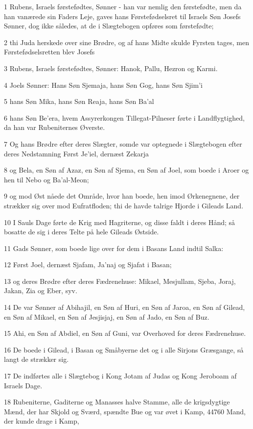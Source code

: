 \par 1 Rubens, Israels førstefødtes, Sønner - han var nemlig den førstefødte, men da han vanærede sin Faders Leje, gaves hans Førstefødselsret til Israels Søn Josefs Sønner, dog ikke således, at de i Slægtebogen opføres som førstefødte;
\par 2 thi Juda herskede over sine Brødre, og af hans Midte skulde Fyrsten tages, men Førstefødselsretten blev Josefs
\par 3 Rubens, Israels førstefødtes, Sønner: Hanok, Pallu, Hezron og Karmi.
\par 4 Joels Sønner: Hans Søn Sjemaja, hans Søn Gog, hans Søn Sjim'i
\par 5 hans Søn Mika, hans Søn Reaja, hans Søn Ba'al
\par 6 hans Søn Be'era, hvem Assyrerkongen Tillegat-Pilneser førte i Landflygtighed, da han var Rubeniternes Øverste.
\par 7 Og hans Brødre efter deres Slægter, somde var optegnede i Slægtebogen efter deres Nedstamning Først Je'iel, dernæst Zekarja
\par 8 og Bela, en Søn af Azaz, en Søn af Sjema, en Søn af Joel, som boede i Aroer og hen til Nebo og Ba'al-Meon;
\par 9 og mod Øst nåede det Område, hvor han boede, hen imod Ørkenegnene, der strækker sig over mod Eufratfloden; thi de havde talrige Hjorde i Gileads Land.
\par 10 I Sauls Dage førte de Krig med Hagriterne, og disse faldt i deres Hånd; så bosatte de sig i deres Telte på hele Gileads Østside.
\par 11 Gads Sønner, som boede lige over for dem i Basans Land indtil Salka:
\par 12 Først Joel, dernæst Sjafam, Ja'naj og Sjafat i Basan;
\par 13 og deres Brødre efter deres Fædrenehuse: Mikael, Mesjullam, Sjeba, Joraj, Jakan, Zia og Eber, syv.
\par 14 De var Sønner af Abihajil, en Søn af Huri, en Søn af Jaroa, en Søn af Gilead, en Søn af Mikael, en Søn af Jesjisjaj, en Søn af Jado, en Søn af Buz.
\par 15 Ahi, en Søn af Abdiel, en Søn af Guni, var Overhoved for deres Fædrenehuse.
\par 16 De boede i Gilead, i Basan og Småbyerne det og i alle Sirjons Græsgange, så langt de strækker sig.
\par 17 De indførtes alle i Slægtebog i Kong Jotam af Judas og Kong Jeroboam af Israels Dage.
\par 18 Rubeniterne, Gaditerne og Manasses halve Stamme, alle de krigsdygtige Mænd, der har Skjold og Sværd, spændte Bue og var øvet i Kamp, 44760 Mand, der kunde drage i Kamp,
